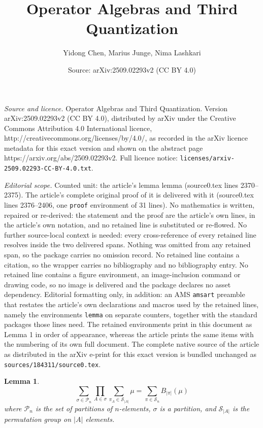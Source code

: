 \documentclass[10pt,a4paper]{amsart}
\title{Operator Algebras and Third Quantization}
\author{Yidong Chen, Marius Junge, Nima Lashkari}
\date{Source: arXiv:2509.02293v2 (CC BY 4.0)}
\newtheorem{lemma}{Lemma}
\begin{document}
\maketitle

\noindent\emph{Source and licence.} Operator Algebras and Third Quantization. Version arXiv:2509.02293v2 (CC BY 4.0), distributed by arXiv under the Creative Commons Attribution 4.0 International licence, http://creativecommons.org/licenses/by/4.0/, as recorded in the arXiv licence metadata for this exact version and shown on the abstract page https://arxiv.org/abs/2509.02293v2. Full licence notice: \texttt{licenses/arxiv-2509.02293-CC-BY-4.0.txt}.\par\smallskip

\noindent\textit{Editorial scope.} Counted unit: the article's lemma lemma (source0.tex lines 2370--2375). The article's complete original proof of it is delivered with it (source0.tex lines 2376--2406, one \texttt{proof} environment of 31 lines). No mathematics is written, repaired or re-derived: the statement and the proof are the article's own lines, in the article's own notation, and no retained line is substituted or re-flowed.  No further source-local context is needed: every cross-reference of every retained line resolves inside the two delivered spans.  Nothing was omitted from any retained span, so the package carries no omission record.  No retained line contains a citation, so the wrapper carries no bibliography and no bibliography entry.  No retained line contains a figure environment, an image-inclusion command or drawing code, so no image is delivered and the package declares no asset dependency.  Editorial formatting only, in addition: an AMS \texttt{amsart} preamble that restates the article's own declarations and macros used by the retained lines, namely the environments \texttt{lemma} on separate counters, together with the standard packages those lines need.  The retained environments print in this document as Lemma 1 in order of appearance, whereas the article prints the same items with the numbering of its own full document.  The complete native source of the article as distributed in the arXiv e-print for this exact version is bundled unchanged as \texttt{sources/184311/source0.tex}.
\begin{lemma}
    \begin{equation}
        \sum_{\sigma\in\mathcal{P}_n}\prod_{A\in\sigma}\sum_{\pi_A\in \mathcal{S}_{|A|}}\mu = \sum_{\pi\in\mathcal{S}_n}B_{|\pi|}(\mu)
    \end{equation}
    where $\mathcal{P}_n$ is the set of partitions of $n$-elements, $\sigma$ is a partition, and $\mathcal{S}_{|A|}$ is the permutation group on $|A|$ elements.
\end{lemma}
\end{document}
